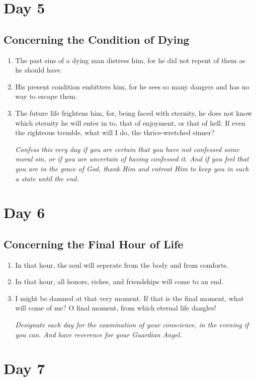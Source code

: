 \documentclass[11pt]{article}
\begin{document}
\section{Day 5}
\label{sec:org6f80c82}
\subsection{Concerning the Condition of Dying}
\label{sec:orgbcfcf0d}
\begin{enumerate}
\item The past sins of a dying man distress him, for he did not repent of them as he should have.
\item His present condition embitters him, for he sees so many dangers and has no way to escape them.
\item The future life frightens him, for, being faced with eternity, he does not know which eternity
he will enter in to, that of enjoyment, or that of hell. If even the righteous tremble, what
will I do, the thrice-wretched sinner?

\emph{Confess this very day if you are certain that you have not confessed some moral sin, or if you are uncertain of having confessed it. And if you feel that you are in the grace of God, thank Him and entreat Him
to keep you in such a state until the end.}
\end{enumerate}
\section{Day 6}
\label{sec:org883f811}
\subsection{Concerning the Final Hour of Life}
\label{sec:orgd0bba59}
\begin{enumerate}
\item In that hour, the soul will seperate from the body and from comforts.
\item In that hour, all honors, riches, and friendships will come to an end.
\item I might be damned at that very moment. If that is the final moment, what will come of me?
O final moment, from which eternal life dangles!

\emph{Designate each day for the examination of your conscience, in the evening if you can. And have reverence for your Guardian Angel.}
\end{enumerate}
\section{Day 7}
\label{sec:org9886491}
\end{document}
